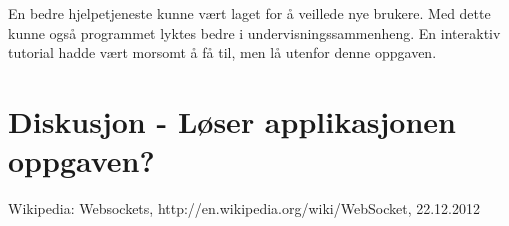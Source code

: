 \documentclass[12pt,twoside,onecolumn]{article}
\begin{document}
	En bedre hjelpetjeneste kunne vært laget for å veillede nye brukere. Med dette kunne også programmet lyktes bedre i undervisningssammenheng. En interaktiv tutorial hadde vært morsomt å få til, men lå utenfor denne oppgaven. 
\section{Diskusjon - Løser applikasjonen oppgaven?}

	

\newpage
\begin{thebibliography}{9}

	Wikipedia: Websockets, http://en.wikipedia.org/wiki/WebSocket, 22.12.2012

\end{thebibliography}

\listoffigures
\end{document}
